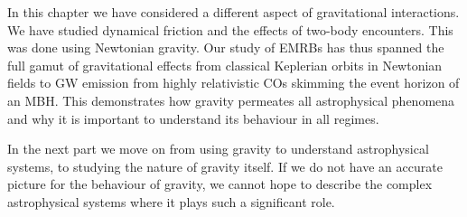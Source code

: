 In this chapter we have considered a different aspect of gravitational interactions. We have studied dynamical friction and the effects of two-body encounters. This was done using Newtonian gravity. Our study of EMRBs has thus spanned the full gamut of gravitational effects from classical Keplerian orbits in Newtonian fields to GW emission from highly relativistic COs skimming the event horizon of an MBH. This demonstrates how gravity permeates all astrophysical phenomena and why it is important to understand its behaviour in all regimes.

In the next part we move on from using gravity to understand astrophysical systems, to studying the nature of gravity itself. If we do not have an accurate picture for the behaviour of gravity, we cannot hope to describe the complex astrophysical systems where it plays such a significant role.
